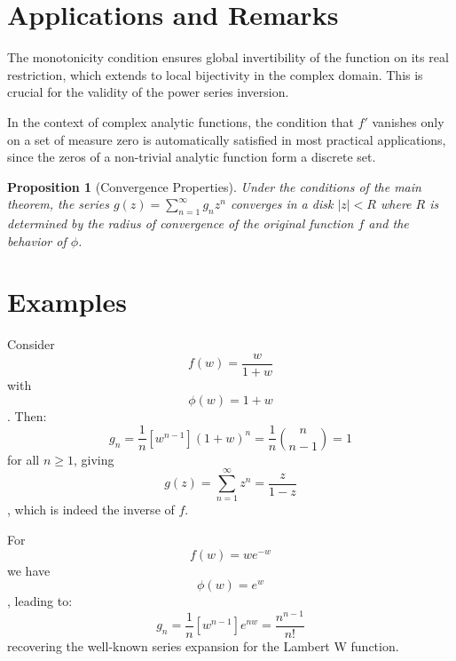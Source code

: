 \documentclass{article}
\newcommand{\tmtextbf}[1]{\text{{\bfseries{#1}}}}
\newtheorem{proposition}{Proposition}
{\theorembodyfont{\rmfamily}\newtheorem{remark}{Remark}}
\begin{document}
\section{Applications and Remarks}

\begin{remark}
   The monotonicity condition ensures global
  invertibility of the function on its real restriction, which extends to
  local bijectivity in the complex domain. This is crucial for the validity of
  the power series inversion.
\end{remark}

\begin{remark}
   In the context of complex analytic
  functions, the condition that $f'$ vanishes only on a set of measure zero is
  automatically satisfied in most practical applications, since the zeros of a
  non-trivial analytic function form a discrete set.
\end{remark}

\begin{proposition}
  [Convergence Properties] Under the conditions of the main theorem, the
  series $g (z) = \sum_{n = 1}^{\infty} g_n z^n$ converges in a disk $|z| < R$
  where $R$ is determined by the radius of convergence of the original
  function $f$ and the behavior of $\phi$.
\end{proposition}

\section{Examples}

\tmtextbf{Example 1:} Consider
\begin{equation}
  f (w) = \frac{w}{1 + w}
\end{equation}
with
\begin{equation}
  \phi (w) = 1 + w
\end{equation}
. Then:
\begin{equation}
  g_n = \frac{1}{n} [w^{n - 1}]  (1 + w)^n = \frac{1}{n} \binom{n}{n - 1} = 1
\end{equation}
for all $n \geq 1$, giving
\begin{equation}
  g (z) = \sum_{n = 1}^{\infty} z^n = \frac{z}{1 - z}
\end{equation}
, which is indeed the inverse of $f$.

\tmtextbf{Example 2:} For
\begin{equation}
  f (w) = we^{- w}
\end{equation}
we have
\begin{equation}
  \phi (w) = e^w
\end{equation}
, leading to:
\begin{equation}
  g_n = \frac{1}{n} [w^{n - 1}] e^{nw} = \frac{n^{n - 1}}{n!}
\end{equation}
recovering the well-known series expansion for the Lambert W function.
\end{document}
